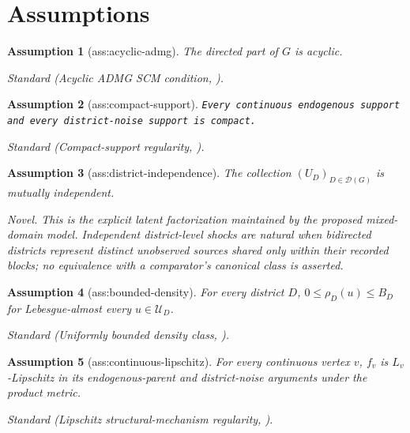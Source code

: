 \documentclass{article}
\newtheorem{assumption}{Assumption}
\begin{document}
\section{Assumptions}

\begin{assumption}[ass:acyclic-admg]\label{ass:acyclic-admg}
The directed part of \(G\) is acyclic.
\par\smallskip\noindent\emph{Standard} (Acyclic ADMG SCM condition, \cite{ZhangTianBareinboim2022}).
\end{assumption}

\begin{assumption}[ass:compact-support]\label{ass:compact-support}
\texttt{Every continuous endogenous support and every district-\allowbreak{}noise support is compact.}
\par\smallskip\noindent\emph{Standard} (Compact-support regularity, \cite{TanBlanchetSyrgkanis2024}).
\end{assumption}

\begin{assumption}[ass:district-independence]\label{ass:district-independence}
The collection \((U_D)_{D\in\mathcal D(G)}\) is mutually independent.
\par\smallskip\noindent\emph{Novel.} This is the explicit latent factorization maintained by the proposed mixed-domain model. Independent district-level shocks are natural when bidirected districts represent distinct unobserved sources shared only within their recorded blocks; no equivalence with a comparator's canonical class is asserted.
\end{assumption}

\begin{assumption}[ass:bounded-density]\label{ass:bounded-density}
For every district \(D\), \(0\le\rho_D(u)\le B_D\) for Lebesgue-almost every \(u\in\mathcal U_D\).
\par\smallskip\noindent\emph{Standard} (Uniformly bounded density class, \cite{Tsybakov2009}).
\end{assumption}

\begin{assumption}[ass:continuous-lipschitz]\label{ass:continuous-lipschitz}
For every continuous vertex \(v\), \(f_v\) is \(L_v\)-Lipschitz in its endogenous-parent and district-noise arguments under the product metric.
\par\smallskip\noindent\emph{Standard} (Lipschitz structural-mechanism regularity, \cite{TanBlanchetSyrgkanis2024}).
\end{assumption}
\end{document}
